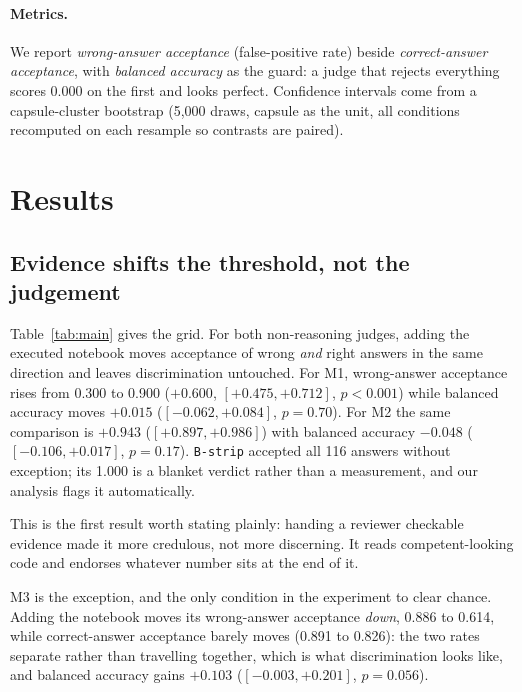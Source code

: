 \documentclass{article}
\begin{document}
\paragraph{Metrics.} We report \emph{wrong-answer acceptance} (false-positive rate) beside
\emph{correct-answer acceptance}, with \emph{balanced accuracy} as the guard: a judge that
rejects everything scores 0.000 on the first and looks perfect. Confidence intervals come
from a capsule-cluster bootstrap (5{,}000 draws, capsule as the unit, all conditions
recomputed on each resample so contrasts are paired).

\section{Results}

\subsection{Evidence shifts the threshold, not the judgement}
\label{sec:threshold}

Table~\ref{tab:main} gives the grid. For both non-reasoning judges, adding the executed
notebook moves acceptance of wrong \emph{and} right answers in the same direction and
leaves discrimination untouched. For M1, wrong-answer acceptance rises from 0.300 to
0.900 ($+0.600$, $[+0.475, +0.712]$, $p<0.001$) while balanced accuracy moves $+0.015$
($[-0.062, +0.084]$, $p=0.70$). For M2 the same comparison is $+0.943$
($[+0.897, +0.986]$) with balanced accuracy $-0.048$ ($[-0.106, +0.017]$, $p=0.17$). \texttt{B-strip} accepted all 116 answers without exception; its 1.000 is a
blanket verdict rather than a measurement, and our analysis flags it automatically.

This is the first result worth stating plainly: handing a reviewer checkable evidence made
it more credulous, not more discerning. It reads competent-looking code and endorses
whatever number sits at the end of it.

M3 is the exception, and the only condition in the experiment to clear chance. Adding the
notebook moves its wrong-answer acceptance \emph{down}, 0.886 to 0.614, while
correct-answer acceptance barely moves (0.891 to 0.826): the two rates separate rather
than travelling together, which is what discrimination looks like, and balanced accuracy
gains $+0.103$ ($[-0.003, +0.201]$, $p=0.056$).
\end{document}
